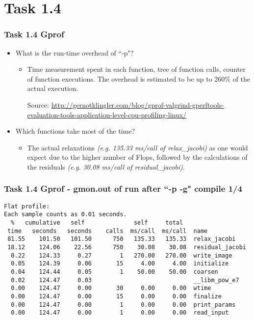 \section{Task 1.4}
\begin{frame}
\frametitle{Task 1.4 Gprof}
\begin{itemize}
	\item What is the run-time overhead of ``-p"?
	\begin{itemize}
		\item Time measurement spent in each function, tree of function calls, counter of function executions. The overhead is estimated to be up to 260\% of the actual execution.\medskip
		
		Source: \url{http://gernotklingler.com/blog/gprof-valgrind-gperftools-evaluation-tools-application-level-cpu-profiling-linux/}
	\end{itemize}
	\item Which functions take most of the time?
	\begin{itemize}
		\item The actual relaxations \textit{(e.g. 135.33 ms/call of relax\_jacobi)} as one would expect due to the higher number of Flops, followed by the calculations of the residuals \textit{(e.g. 30.08 ms/call of residual\_jacobi)}.
	\end{itemize}
\end{itemize}
\end{frame}

\begin{frame}[fragile]
\frametitle{Task 1.4 Gprof - gmon.out of run after ``-p -g" compile 1/4}
\begin{lstlisting}
Flat profile:
Each sample counts as 0.01 seconds.
  %   cumulative   self              self     total           
 time   seconds   seconds    calls  ms/call  ms/call  name    
 81.55    101.50   101.50      750   135.33   135.33  relax_jacobi
 18.12    124.06    22.56      750    30.08    30.08  residual_jacobi
  0.22    124.33     0.27        1   270.00   270.00  write_image
  0.05    124.39     0.06       15     4.00     4.00  initialize
  0.04    124.44     0.05        1    50.00    50.00  coarsen
  0.02    124.47     0.03                             __libm_pow_e7
  0.00    124.47     0.00       30     0.00     0.00  wtime
  0.00    124.47     0.00       15     0.00     0.00  finalize
  0.00    124.47     0.00        1     0.00     0.00  print_params
  0.00    124.47     0.00        1     0.00     0.00  read_input
\end{lstlisting}
\end{frame}

